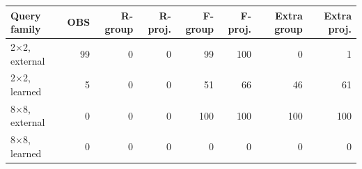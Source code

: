 \begin{tabular}{lrrrrrrr}
\toprule
Query family & OBS & R-group & R-proj. & F-group & F-proj. & Extra group & Extra proj.\\
\midrule
2$\times$2, external & 99 & 0 & 0 & 99 & 100 & 0 & 1\\
2$\times$2, learned & 5 & 0 & 0 & 51 & 66 & 46 & 61\\
8$\times$8, external & 0 & 0 & 0 & 100 & 100 & 100 & 100\\
8$\times$8, learned & 0 & 0 & 0 & 0 & 0 & 0 & 0\\
\bottomrule
\end{tabular}
